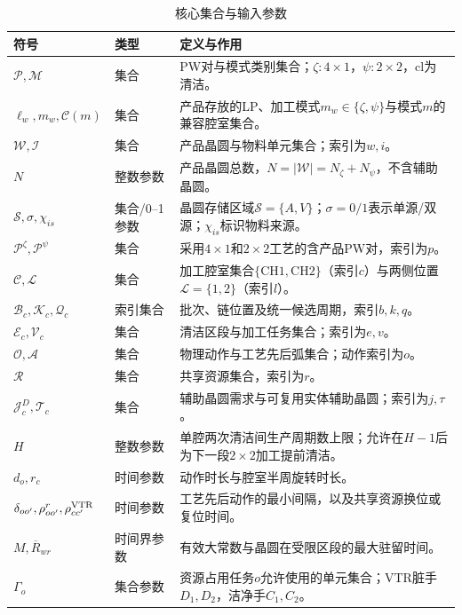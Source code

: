 \documentclass[final,5p,times,twocolumn]{elsarticle}
\begin{document}
\begin{table}[t]
\centering
\scriptsize
\setlength{\tabcolsep}{3pt}
\caption{核心集合与输入参数}
\label{tab:symbol-cn-a}
\begin{tabular}{C{0.20\textwidth}C{0.16\textwidth}C{0.43\textwidth}}
\toprule
符号 & 类型 & 定义与作用 \\
\midrule
$\mathcal P,\mathcal M$ & 集合 & PW对与模式类别集合；$\zeta:4\times1$，$\psi:2\times2$，$\mathrm{cl}$为清洁。\\
$\ell_w,m_w,\mathcal C(m)$ & 集合 & 产品存放的LP、加工模式$m_w\in\{\zeta,\psi\}$与模式$m$的兼容腔室集合。\\
$\mathcal W,\mathcal I$ & 集合 & 产品晶圆与物料单元集合；索引为$w,i$。\\
$N$ & 整数参数 & 产品晶圆总数，$N=|\mathcal W|=N_{\zeta}+N_{\psi}$，不含辅助晶圆。\\
$\mathcal S,\sigma,\chi_{is}$ & 集合/0--1参数 & 晶圆存储区域$\mathcal S=\{A,V\}$；$\sigma=0/1$表示单源/双源；$\chi_{is}$标识物料来源。\\
$\mathcal P^{\zeta},\mathcal P^{\psi}$ & 集合 & 采用$4\times1$和$2\times2$工艺的含产品PW对，索引为$p$。\\
$\mathcal C,\mathcal L$ & 集合 & 加工腔室集合$\{\mathrm{CH1,CH2}\}$（索引$c$）与两侧位置$\mathcal L=\{1,2\}$（索引$l$）。\\
$\mathcal B_c,\mathcal K_c,\mathcal Q_c$ & 索引集合 & 批次、链位置及统一候选周期，索引$b,k,q$。\\
$\mathcal E_c,\mathcal V_c$ & 集合 & 清洁区段与加工任务集合；索引为$e,v$。\\
$\mathcal O,\mathcal A$ & 集合 & 物理动作与工艺先后弧集合；动作索引为$o$。\\
$\mathcal R$ & 集合 & 共享资源集合，索引为$r$。\\
$\mathcal J_c^D,\mathcal T_c$ & 集合 & 辅助晶圆需求与可复用实体辅助晶圆；索引为$j,\tau$。\\
$H$ & 整数参数 & 单腔两次清洁间生产周期数上限；允许在$H-1$后为下一段$2\times2$加工提前清洁。\\
$d_o,r_c$ & 时间参数 & 动作时长与腔室半周旋转时长。\\
$\delta_{oo'},\rho^r_{oo'},\rho^{\rm VTR}_{cc'}$ & 时间参数 & 工艺先后动作的最小间隔，以及共享资源换位或复位时间。\\
$M,\overline R_{wr}$ & 时间界参数 & 有效大常数与晶圆在受限区段的最大驻留时间。\\
$\Gamma_o$ & 集合参数 & 资源占用任务$o$允许使用的单元集合；VTR脏手$D_1,D_2$，洁净手$C_1,C_2$。\\

\end{tabular}
\end{table}
\end{document}

